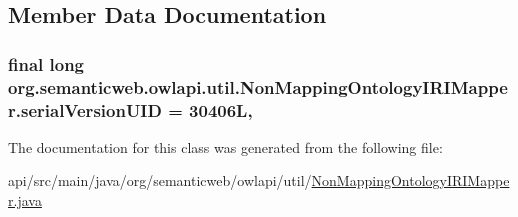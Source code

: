 \subsection{Member Data Documentation}
\hypertarget{classorg_1_1semanticweb_1_1owlapi_1_1util_1_1_non_mapping_ontology_i_r_i_mapper_ac40a2c8a64c9084a7d61b94db47fcfb5}{
\subsubsection[{serial\-Version\-U\-I\-D}]{\setlength{\rightskip}{0pt plus 5cm}final long org.\-semanticweb.\-owlapi.\-util.\-Non\-Mapping\-Ontology\-I\-R\-I\-Mapper.\-serial\-Version\-U\-I\-D = 30406\-L\hspace{0.3cm}{\ttfamily [static]}, {\ttfamily [private]}}}\label{classorg_1_1semanticweb_1_1owlapi_1_1util_1_1_non_mapping_ontology_i_r_i_mapper_ac40a2c8a64c9084a7d61b94db47fcfb5}


The documentation for this class was generated from the following file\-:\begin{DoxyCompactItemize}
\item 
api/src/main/java/org/semanticweb/owlapi/util/\hyperlink{_non_mapping_ontology_i_r_i_mapper_8java}{Non\-Mapping\-Ontology\-I\-R\-I\-Mapper.\-java}\end{DoxyCompactItemize}
